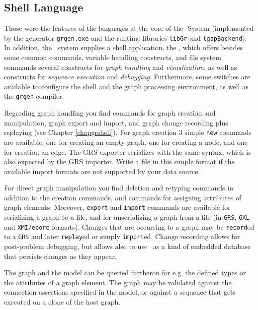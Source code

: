 \subsection{Shell Language}
Those were the features of the languages at the core of the \GrG-System (implemented by the generator \texttt{grgen.exe} and the runtime libraries \texttt{libGr} and \texttt{lgspBackend}).
In addition, the \GrG\ system supplies a shell application, the \GrShell,
which offers besides some common commands, variable handling constructs, and file system commands several constructs for \emph{graph handling} and \emph{visualization}, as well as constructs for \emph{sequence execution} and \emph{debugging}.
Furthermore, some switches are available to configure the shell and the graph processing environment, as well as the \texttt{grgen} compiler.

Regarding graph handling you find commands for graph creation and manipulation, graph export and import, and graph change recording plus replaying (see Chapter \ref{chapgrshell}).
For graph creation 3 simple \texttt{new} commands are available, one for creating an empty graph, one for creating a node, and one for creation an edge.
The GRS exporter serializes with the same syntax, which is also expected by the GRS importer.
Write a file in this simple format if the available import formats are not supported by your data source.

For direct graph manipulation you find deletion and retyping commands in addition to the creation commands, and commands for assigning attributes of graph elements.
Moreover, \texttt{export} and \texttt{import} commands are available for serializing a graph to a file, and for unserializing a graph from a file (in \texttt{GRS}, \texttt{GXL} and \texttt{XMI/ecore} formats). 
Changes that are occurring to a graph may be \texttt{record}ed to a \texttt{GRS} and later \texttt{replay}ed or simply \texttt{import}ed.
Change recording allows for post-problem debugging, but allows also to use \GrG\ as a kind of embedded database that persists changes as they appear. %

The graph and the model can be queried furtheron for e.g. the defined types or the attributes of a graph element.
The graph may be validated against the connection assertions specified in the model, or against a sequence that gets executed on a clone of the host graph.


